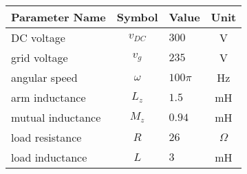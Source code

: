 \begin{tabular}{lclc}
\hline
 Parameter Name    &  Symbol  & Value     &   Unit   \\
\hline
 DC voltage        & $v_{DC}$ & $300$     &    V     \\
 grid voltage      & $v_{g}$  & $235$     &    V     \\
 angular speed     & $\omega$ & $100 \pi$ &    Hz    \\
 arm inductance    & $L_{z}$  & $1.5$     &    mH    \\
 mutual inductance & $M_{z}$  & $0.94$    &    mH    \\
 load resistance   &   $R$    & $26$      & $\Omega$ \\
 load inductance   &   $L$    & $3$       &    mH    \\
\hline
\end{tabular}